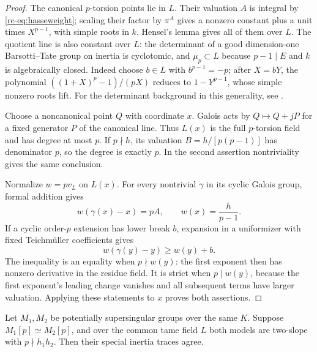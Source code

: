 \begin{proof}
The canonical $p$-torsion points lie in $L$. Their valuation $A$ is integral
by \eqref{rc-eq:hasseweight}; scaling their factor by $\pi^A$ gives a nonzero
constant plus a unit times $X^{p-1}$, with simple roots in $k$.
Hensel's lemma gives all of them over $L$.
The quotient line is also constant over $L$: the determinant of a good
dimension-one Barsotti--Tate group on inertia is cyclotomic, and
$\mu_p\subset L$ because $p-1\mid E$ and $k$ is algebraically closed.
Indeed choose $b\in L$ with $b^{p-1}=-p$; after $X=bY$, the polynomial
$((1+X)^p-1)/(pX)$ reduces to $1-Y^{p-1}$, whose simple nonzero roots lift.
For the determinant background in this generality, see
\citet[proof of Proposition 5.2.2]{Liu2007}.

Choose a noncanonical point $Q$ with coordinate $x$. Galois acts by
$Q\mapsto Q+jP$ for a fixed generator $P$ of the canonical line. Thus
$L(x)$ is the full $p$-torsion field and has degree at most $p$.
If $p\nmid h$, its valuation $B=h/[p(p-1)]$ has denominator $p$, so the
degree is exactly $p$. In the second assertion nontriviality gives the same
conclusion.

Normalize $w=pv_L$ on $L(x)$. For every nontrivial $\gamma$ in its cyclic
Galois group, formal addition gives
\[
 w(\gamma(x)-x)=pA,\qquad w(x)=\frac h{p-1}.
\]
If a cyclic order-$p$ extension has lower break $b$, expansion in a
uniformizer with fixed Teichm\"uller coefficients gives
\[
 w(\gamma(y)-y)\geq w(y)+b.
\]
The inequality is an equality when $p\nmid w(y)$: the first exponent then
has nonzero derivative in the residue field. It is strict when
$p\mid w(y)$, because the first exponent's leading change vanishes and
all subsequent terms have larger valuation. Applying these statements to
$x$ proves both assertions.
\end{proof}

\begin{theorem}\label{rc-thm:primehasse}
Let $M_1,M_2$ be potentially supersingular groups over the same $K$.
Suppose $M_1[p]\simeq M_2[p]$, and over the common tame field $L$ both
models are two-slope with $p\nmid h_1h_2$. Then their special inertia traces
agree.
\end{theorem}

